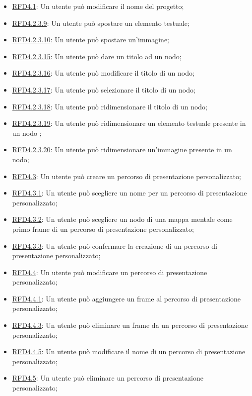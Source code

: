 \begin{itemize}
\item \hyperlink{RFD4.1}{RFD4.1}: Un utente può modificare il nome del progetto;
\item \hyperlink{RFD4.2.3.9}{RFD4.2.3.9}: Un utente può spostare un elemento testuale;
\item \hyperlink{RFD4.2.3.10}{RFD4.2.3.10}: Un utente può spostare un’immagine;
\item \hyperlink{RFD4.2.3.15}{RFD4.2.3.15}: Un utente può dare un titolo ad un nodo;
\item \hyperlink{RFD4.2.3.16}{RFD4.2.3.16}: Un utente può modificare il titolo di un nodo;
\item \hyperlink{RFD4.2.3.17}{RFD4.2.3.17}: Un utente può selezionare il titolo di un nodo;
\item \hyperlink{RFD4.2.3.18}{RFD4.2.3.18}: Un utente può ridimensionare il titolo di un nodo;
\item \hyperlink{RFD4.2.3.19}{RFD4.2.3.19}: Un utente può ridimensionare un elemento testuale presente in un nodo
;
\item \hyperlink{RFD4.2.3.20}{RFD4.2.3.20}: Un utente può ridimensionare un’immagine presente in un nodo;
\item \hyperlink{RFD4.3}{RFD4.3}: Un utente può creare un percorso di presentazione personalizzato;
\item \hyperlink{RFD4.3.1}{RFD4.3.1}: Un utente può scegliere un nome per un percorso di presentazione personalizzato;
\item \hyperlink{RFD4.3.2}{RFD4.3.2}: Un utente può scegliere un nodo di una mappa mentale come primo frame di un percorso di presentazione personalizzato;
\item \hyperlink{RFD4.3.3}{RFD4.3.3}: Un utente può confermare la creazione di un percorso di presentazione personalizzato;
\item \hyperlink{RFD4.4}{RFD4.4}: Un utente può modificare un percorso di presentazione personalizzato;
\item \hyperlink{RFD4.4.1}{RFD4.4.1}: Un utente può aggiungere un frame al percorso di presentazione personalizzato;
\item \hyperlink{RFD4.4.3}{RFD4.4.3}: Un utente può eliminare un frame da un percorso di presentazione personalizzato;
\item \hyperlink{RFD4.4.5}{RFD4.4.5}: Un utente può modificare il nome di un percorso di presentazione personalizzato;
\item \hyperlink{RFD4.5}{RFD4.5}: Un utente può eliminare un percorso di presentazione personalizzato;

\end{itemize}
